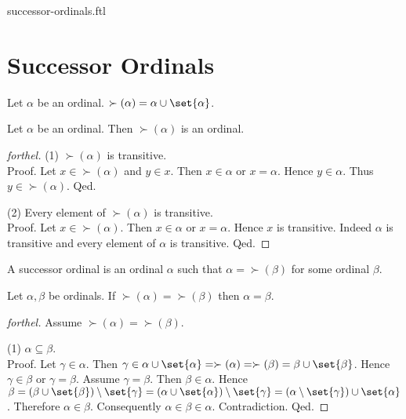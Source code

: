 \documentclass{naproche-library}
\begin{document}
\begin{smodule}{successor-ordinals.ftl}


  \section*{Successor Ordinals}

  \begin{definition}[forthel,id=SET_THEORY_02_8166925802668032,printid]
    Let $\alpha$ be an ordinal.
    $\succ(\alpha) = \alpha \cup \set{\alpha}$.
  \end{definition}

  \begin{proposition}[forthel,id=SET_THEORY_02_1624410224066560,printid]
    Let $\alpha$ be an ordinal.
    Then $\succ(\alpha)$ is an ordinal.
  \end{proposition}
  \begin{proof}[forthel]
    (1) $\succ(\alpha)$ is transitive. \\
    Proof.
      Let $x \in \succ(\alpha)$ and $y \in x$.
      Then $x \in \alpha$ or $x = \alpha$.
      Hence $y \in \alpha$.
      Thus $y \in \succ(\alpha)$.
    Qed.

    (2) Every element of $\succ(\alpha)$ is transitive. \\
    Proof.
      Let $x \in \succ(\alpha)$.
      Then $x \in \alpha$ or $x = \alpha$.
      Hence $x$ is transitive.
      Indeed $\alpha$ is transitive and every element of $\alpha$ is transitive.
    Qed.
  \end{proof}

  \begin{definition}[forthel,id=SET_THEORY_02_7129712109289472,printid]
    A successor ordinal is an ordinal $\alpha$ such that $\alpha = \succ(\beta)$ for some ordinal $\beta$.
  \end{definition}

  \begin{proposition}[forthel,id=SET_THEORY_02_8651096763400192,printid]
    Let $\alpha, \beta$ be ordinals.
    If $\succ(\alpha) = \succ(\beta)$ then $\alpha = \beta$.
  \end{proposition}
  \begin{proof}[forthel]
    Assume $\succ(\alpha) = \succ(\beta)$.

    (1) $\alpha \subseteq \beta$. \\
    Proof.
      Let $\gamma \in \alpha$.
      Then $\gamma \in \alpha \cup \set{\alpha}
        = \succ(\alpha)
        = \succ(\beta)
        = \beta \cup \set{\beta}$.
      Hence $\gamma \in \beta$ or $\gamma = \beta$.
      Assume $\gamma = \beta$.
      Then $\beta \in \alpha$.
      Hence $\beta
        = (\beta \cup \set{\beta}) \setminus \set{\gamma}
        = (\alpha \cup \set{\alpha}) \setminus \set{\gamma}
        = (\alpha \setminus \set{\gamma}) \cup \set{\alpha}$.
      Therefore $\alpha \in \beta$.
      Consequently $\alpha \in \beta \in \alpha$.
      Contradiction.
    Qed.


\end{proof}
\end{smodule}
\end{document}
